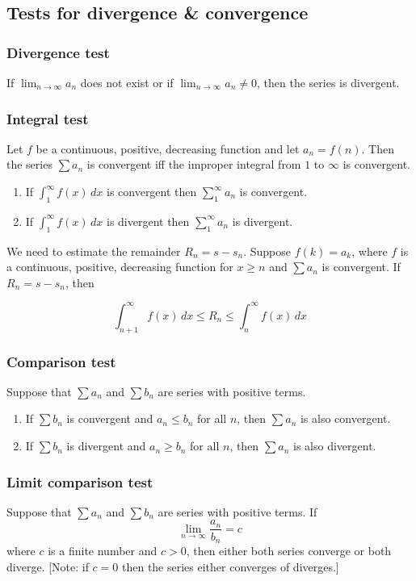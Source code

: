 \documentclass[a4paper]{article}
\begin{document}
\subsection{Tests for divergence \& convergence}
\subsubsection*{Divergence test}
If $\lim_{n\rightarrow\infty} a_n$ does not exist or if $\lim_{n\rightarrow\infty} a_n\not=0$, then the series is 
divergent.

\subsubsection*{Integral test}
Let $f$ be a continuous, positive, decreasing function and let $a_n=f(n)$. Then the series $\sum a_n$ is convergent iff the improper integral from $1$ to $\infty$ is convergent.

\begin{enumerate}
    \item If $\int_{1}^{\infty}f(x)\,dx$ is convergent then $\sum_{1}^{\infty} a_n$ is convergent.
    \item If $\int_{1}^{\infty}f(x)\,dx$ is divergent then $\sum_{1}^{\infty} a_n$ is divergent. 
\end{enumerate}

We need to estimate the remainder $R_n=s-s_n$. Suppose $f(k)=a_k$, where $f$ is a continuous, positive, decreasing function for $x\ge n$ and $\sum a_n$ is convergent. If $R_n=s-s_n$, then

\begin{equation}
    \int_{n+1}^{\infty}f(x)\,dx\le R_n\le \int_{n}^{\infty}f(x)\,dx
\end{equation}

\subsubsection*{Comparison test}
Suppose that $\sum a_n$ and $\sum b_n$ are series with positive terms.
\begin{enumerate}
    \item If $\sum b_n$ is convergent and $a_n\le b_n$ for all $n$, then $\sum a_n$ is also convergent.
    \item If $\sum b_n$ is divergent and $a_n\ge b_n$ for all $n$, then $\sum a_n$ is also divergent.
\end{enumerate}

\subsubsection*{Limit comparison test}
Suppose that $\sum a_n$ and $\sum b_n$ are series with positive terms. If 
\begin{equation}
    \lim_{n\rightarrow\infty}\frac{a_n}{b_n}=c
\end{equation}
where $c$ is a finite number and $c>0$, then either both series converge or both diverge. [Note: if $c=0$ then the series either converges of diverges.]
\end{document}
